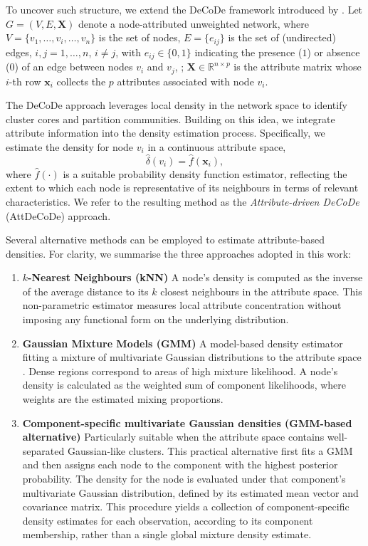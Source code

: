 \documentclass[11pt]{article}
\begin{document}
To uncover such structure, we extend the DeCoDe framework introduced by \cite{Menardi2022Density-basedNetworks}. Let $G = (V, E, \bm{X})$ denote a node-attributed unweighted network, where 
$V = \{v_1, \dots, v_i, \dots, v_n\}$ is the set of nodes, 
$E = \{ e_{ij} \}$ is the set of (undirected) edges, $i,j = 1, \ldots, n$, $i \neq j$,  with $e_{ij} \in \{0,1\}$ indicating the presence ($1$) or absence ($0$) of an edge between nodes $v_i$ and $v_j$, ; 
$\bm{X} \in \mathbb{R}^{n \times p}$ is the attribute matrix whose $i$-th row $\bm{x}_i$ collects the $p$ attributes associated with node $v_i$.

The DeCoDe approach leverages local density in the network space to identify cluster cores and partition communities. Building on this idea, we integrate attribute information into the density estimation process. Specifically, we estimate the density for node $v_i$ in a continuous attribute space,
$$
\hat\delta(v_i) = \hat f(\bm{x}_i),
$$
where $\hat{f}(\cdot)$ is a suitable probability density function estimator, reflecting the extent to which each node is representative of its neighbours in terms of relevant characteristics. We refer to the resulting method as the {\em Attribute-driven DeCoDe} (AttDeCoDe) approach.

Several alternative methods can be employed to estimate attribute-based densities.
For clarity, we summarise the three approaches adopted in this work:

\begin{enumerate}
    \item \textbf{$k$-Nearest Neighbours (kNN)}
    A node’s density is computed as the inverse of the average distance to its $k$ closest neighbours in the attribute space. This non-parametric estimator measures local attribute concentration without imposing any functional form on the underlying distribution.

    \item \textbf{Gaussian Mixture Models (GMM)}
    A model-based density estimator fitting a mixture of multivariate Gaussian distributions to the attribute space \citep{Bouveyron_Celeux_Murphy_Raftery_2019}. Dense regions correspond to areas of high mixture likelihood. A node’s density is calculated as the weighted sum of component likelihoods, where weights are the estimated mixing proportions.

    \item \textbf{Component-specific multivariate Gaussian densities (GMM-based alternative)}
    Particularly suitable when the attribute space contains well-separated Gaussian-like clusters. 
    This practical alternative first fits a GMM and then assigns each node to the component with the highest posterior probability. The density for the node is evaluated under that component’s multivariate Gaussian distribution, defined by its estimated mean vector and covariance matrix. 
    This procedure yields a collection of component-specific density estimates for each observation, according to its component membership, rather than a single global mixture density estimate.
\end{enumerate}
\end{document}
